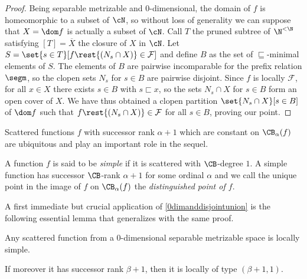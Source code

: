 \begin{proof}
Being separable metrizable and 0-dimensional, the domain of $f$ is homeomorphic to a subset of $\cN$,
so without loss of generality we can suppose that $X=\dom f$ is actually a subset of $\cN$.
Call $T$ the pruned subtree of $\N^{<\N}$ satisfying $[T]=\overline{X}$ the closure of $X$ in $\cN$. 
Let $S=\set{s\in T}[f\rest{(N_{s}\cap X)}\in\mathcal{F}]$ and define $B$ as the set of $\sqsubseteq$-minimal elements of $S$.
The elements of $B$ are pairwise incomparable for the prefix relation $\segm$, so the clopen sets $N_s$ for $s\in B$ are pairwise disjoint.
Since $f$ is locally $\mathcal{F}$, for all $x\in X$ there exists $s\in B$ with $s\sqsubset x$, so the sets $N_s\cap X$ for $s\in B$ form an open cover of $X$.
We have thus obtained a clopen partition $\set{N_s\cap X}[s\in B]$ of $\dom f$ such that $f\rest{(N_s\cap X)}\in\mathcal{F}$ for all $s\in B$, proving our point.
\end{proof}

Scattered functions $f$ with successor rank $\alpha+1$ which are constant on $\CB_\alpha(f)$ are ubiquitous and play an important role in the sequel. 
\begin{definition}
A function $f$ is said to be \emph{simple} if it is scattered with $\CB$-degree $1$. A simple function has successor $\CB$-rank $\alpha+1$ for some ordinal $\alpha$ and we call the unique point in the image of $f$ on  $\CB_{\alpha}(f)$ the \emph{distinguished point of $f$}.
\end{definition}
A first immediate but crucial application of \cref{0dimanddisjointunion} is the following essential lemma that generalizes \cite[Lemma 2.4]{carroy2013quasi} with the same proof.

\begin{lemma}\label{JSLdecompositionlemma}
Any scattered function from a $0$-dim\-en\-sional separable metrizable space is locally simple.

If moreover it has successor rank $\beta+1$, then it is locally of type $(\beta+1,1)$. %
\end{lemma}

